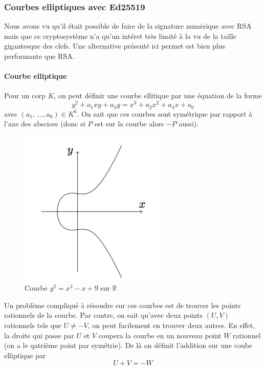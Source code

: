 \documentclass[a4paper, 12pt]{article}
\begin{document}
\subsubsection{Courbes elliptiques avec Ed25519}
Nous avons vu qu'il était possible de faire de la signature numérique avec RSA mais que ce cryptosystème n'a qu'un intéret très limité à la vu de la taille gigantesque des clefs. Une alternative présenté ici permet est bien plus performante que RSA.
\paragraph{Courbe elliptique}
\noindent Pour un corp $K$, on peut définir une courbe ellitique par une équation de la forme 
$$
y^2 + a_1xy + a_3y = x^3 + a_2x^2 +a_4x + a_6
$$
avec $(a_1,\, \dots, a_6) \in K^6$. On sait que ces courbes sont symétrique par rapport à l'axe des abscices (donc si $P$ est sur la courbe alors $-P$ aussi). \\

\begin{figure}[h]
	\centering
	\includegraphics[width=.5\textwidth]{img/courbe1.png}
	\caption{Courbe $y^2 = x^3 - x + 9$ sur $\mathbb{R}$}
	\label{courbe1}
\end{figure}



\label{methodecorde}Un problème compliqué à résoudre sur ces courbes est de trouver les points rationnels de la courbe. Par contre, on sait qu'avec deux points $(U, V)$ rationnels tels que $U \neq -V$, on peut facilement en trouver deux autres. En effet, la droite qui passe par $U$ et $V$ coupera la courbe en un nouveau point $W$ rationnel (on a le qatrième point par symétrie).
De là on définit l'addition sur une coube elliptique par 
$$
U + V = - W
$$
\end{document}
